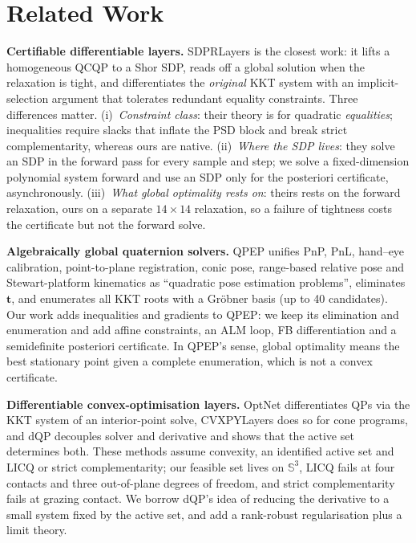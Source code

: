 \section{Related Work}\label{sec:related}

\textbf{Certifiable differentiable layers.} SDPRLayers \cite{holmes2025sdpr} is the closest work: it lifts a homogeneous QCQP to a Shor SDP, reads off a global solution when the relaxation is tight, and differentiates the \emph{original} KKT system with an implicit-selection argument that tolerates redundant equality constraints. Three differences matter. (i)~\emph{Constraint class}: their theory is for quadratic \emph{equalities}; inequalities require slacks that inflate the PSD block and break strict complementarity, whereas ours are native. (ii)~\emph{Where the SDP lives}: they solve an SDP in the forward pass for every sample and step; we solve a fixed-dimension polynomial system forward and use an SDP only for the posteriori certificate, asynchronously. (iii)~\emph{What global optimality rests on}: theirs rests on the forward relaxation, ours on a separate $14\times14$ relaxation, so a failure of tightness costs the certificate but not the forward solve.

\textbf{Algebraically global quaternion solvers.} QPEP \cite{wu2022qpep} unifies PnP, PnL, hand--eye calibration, point-to-plane registration, conic pose, range-based relative pose and Stewart-platform kinematics as ``quadratic pose estimation problems'', eliminates $\mathbf t$, and enumerates all KKT roots with a Gr\"obner basis (up to 40 candidates). Our work adds inequalities and gradients to QPEP: we keep its elimination and enumeration and add affine constraints, an ALM loop, FB differentiation and a semidefinite posteriori certificate. In QPEP's sense, global optimality means the best stationary point given a complete enumeration, which is not a convex certificate.

\textbf{Differentiable convex-optimisation layers.} OptNet \cite{amos2017optnet} differentiates QPs via the KKT system of an interior-point solve, CVXPYLayers \cite{agrawal2019cvxpylayers} does so for cone programs, and dQP \cite{magoon2025dqp} decouples solver and derivative and shows that the active set determines both. These methods assume convexity, an identified active set and LICQ or strict complementarity; our feasible set lives on $\mathbb{S}^3$, LICQ fails at four contacts and three out-of-plane degrees of freedom, and strict complementarity fails at grazing contact. We borrow dQP's idea of reducing the derivative to a small system fixed by the active set, and add a rank-robust regularisation plus a limit theory.

